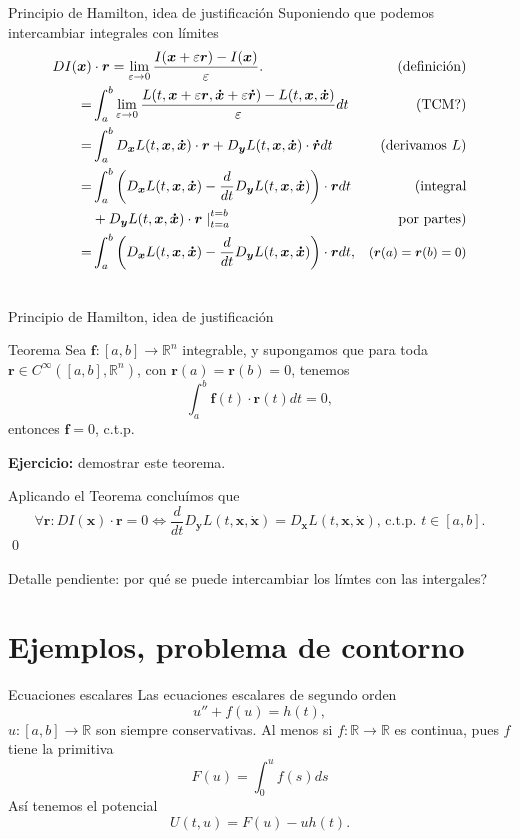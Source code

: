 \documentclass[handout,hyperref={colorlinks=true}]{beamer}
\newcommand{\rr}{\mathbb{R}}
\renewcommand{\b}[1]{\boldsymbol{#1}}
\renewcommand{\epsilon}{\varepsilon}
\begin{document}
\begin{frame}{Principio de Hamilton, idea de justificación  } 
Suponiendo que podemos intercambiar integrales con límites
\begin{align} DI(\b{x})&\cdot \b{r}=\lim_{\epsilon\to 0}\frac{I(\b{x}+\epsilon \b{r})-I(\b{x})}{\epsilon}. &\text{(definición)}\notag\\
=& \int_a^b\lim_{\epsilon\to 0}\frac{L(t,\b{x}+\epsilon \b{r},\b{\dot{x}}+\epsilon \b{\dot{r}}  )- L(t,\b{x},\b{\dot{x}} )  }{\epsilon}dt&\text{(TCM?)}\notag\\
=& \int_a^b D_{\b{x}}L(t,\b{x},\b{\dot{x}})\cdot \b{r}+  D_{\b{y}}L(t,\b{x},\b{\dot{x}})\cdot \b{\dot{r}}dt&\text{(derivamos $L$)}\notag\\
=& \int_a^b \left( D_{\b{x}}L(t,\b{x},\b{\dot{x}})-\frac{d}{dt} D_{\b{y}}L(t,\b{x},\b{\dot{x}})\right) \cdot \b{r}dt&\text{(integral}\notag\\
&+ D_{\b{y}}L(t,\b{x},\b{\dot{x}}) \cdot \b{r}\left.\right|_{t=a}^{t=b} &\text{por partes)}\notag\\
=& \int_a^b \left( D_{\b{x}}L(t,\b{x},\b{\dot{x}})-\frac{d}{dt} D_{\b{y}}L(t,\b{x},\b{\dot{x}})\right) \cdot \b{r}dt,& \small{(\b{r}(a)=\b{r}(b)=0)}\notag\\ \notag
\end{align}


\end{frame}
\begin{frame}{Principio de Hamilton, idea de justificación  } 
\begin{block}{Teorema} Sea $\b{f}:[a,b]\to\rr^n$ integrable, y supongamos que para toda $\b{r}\in C^{\infty}([a,b],\rr^n)$, con $\b{r}(a)=\b{r}(b)=0$, tenemos
\[\int_a^b\b{f}(t)\cdot \b{r}(t)dt=0,\]
entonces $\b{f}=0$, c.t.p.
\end{block}
\textbf{Ejercicio:} demostrar este teorema.

Aplicando el Teorema concluímos que 
\[ \forall \b{r}: DI(\b{x})\cdot \b{r}=0 \Leftrightarrow \frac{d}{dt} D_{\b{y}}L(t,\b{x},\b{\dot{x}})=D_{\b{x}}L(t,\b{x},\b{\dot{x}}),\, \text{c.t.p. } t\in[a,b] .\] \qed

Detalle pendiente: por qué se puede intercambiar los límtes con las intergales?
\end{frame}







\section{Ejemplos, problema de contorno}
\begin{frame}{Ecuaciones escalares}
   Las ecuaciones escalares de segundo orden
\[u''+f(u)=h(t),\]
$u:[a,b]\to\rr$ son siempre conservativas. Al menos si $f:\rr\to\rr$ es continua, pues $f$ tiene la primitiva
\[F(u)=\int_0^uf(s)ds\] 
Así tenemos el potencial
\[U(t,u)=F(u)-uh(t).\]
\end{frame}
\end{document}
